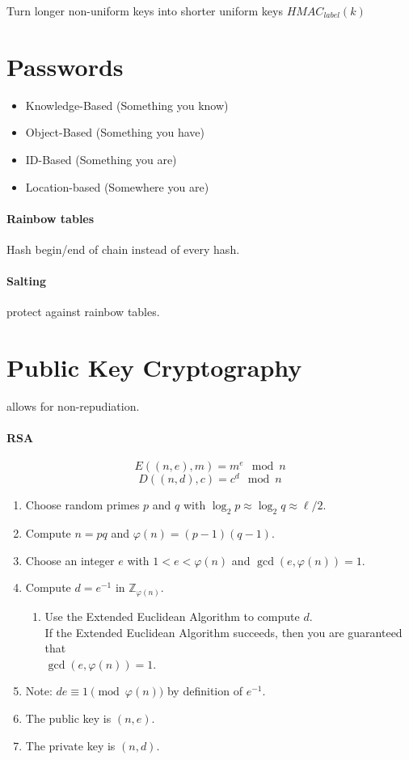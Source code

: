 \documentclass[11pt]{article}
\begin{document}
Turn longer non-uniform keys into shorter uniform keys $HMAC_{label}(k)$

\section{Passwords}

\begin{itemize}
  \item Knowledge-Based (Something you know)
  \item Object-Based (Something you have)
  \item ID-Based (Something you are)
  \item Location-based (Somewhere you are)
\end{itemize}

\paragraph{Rainbow tables} Hash begin/end of chain instead of every hash.

\paragraph{Salting} protect against rainbow tables.

\section{Public Key Cryptography} allows for non-repudiation.

\paragraph{RSA}

$$E((n, e), m) = m^e \mod n$$
$$D((n, d), c) = c^d \mod n$$

\begin{enumerate}
    \item Choose random primes $p$ and $q$ with $\log_2 p \approx \log_2 q \approx \ell/2$.
    \item Compute $n = pq$ and $\varphi(n) = (p-1)(q-1)$.
    \item Choose an integer $e$ with $1 < e < \varphi(n)$ and $\gcd(e, \varphi(n)) = 1$.
    \item Compute $d = e^{-1}$ in $\mathbb{Z}_{\varphi(n)}$.
    \begin{enumerate}
        \item Use the Extended Euclidean Algorithm to compute $d$.\\
        If the Extended Euclidean Algorithm succeeds, then you are guaranteed that\\
        $\gcd(e, \varphi(n)) = 1$.
    \end{enumerate}
    \item[] Note: $de \equiv 1 \pmod{\varphi(n)}$ by definition of $e^{-1}$.
    \item The public key is $(n, e)$.
    \item The private key is $(n, d)$.
\end{enumerate}
\end{document}
